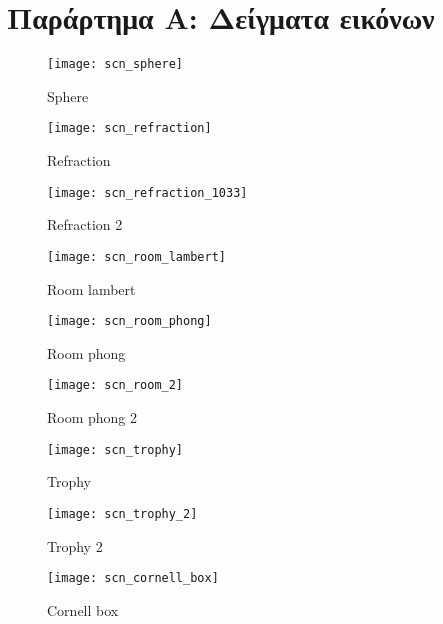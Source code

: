 \chapter{Παράρτημα A: Δείγματα εικόνων}
\clearpage

\graphicspath{{appendix1/fig/}}

\begin{figure} 
\centering 
\texttt{[image: scn\_sphere]}
\caption{Sphere}
\end{figure}

\begin{figure} 
\centering 
\texttt{[image: scn\_refraction]}
\caption{Refraction}
\end{figure}

\begin{figure} 
\centering 
\texttt{[image: scn\_refraction\_1033]}
\caption{Refraction 2}
\end{figure}

\begin{figure} 
\centering 
\texttt{[image: scn\_room\_lambert]}
\caption{Room lambert}
\end{figure}

\begin{figure} 
\centering 
\texttt{[image: scn\_room\_phong]}
\caption{Room phong}
\end{figure}

\begin{figure} 
\centering 
\texttt{[image: scn\_room\_2]}
\caption{Room phong 2}
\end{figure}

\begin{figure} 
\centering 
\texttt{[image: scn\_trophy]}
\caption{Trophy}
\end{figure}

\begin{figure} 
\centering 
\texttt{[image: scn\_trophy\_2]}
\caption{Trophy 2}
\end{figure}

\begin{figure} 
\centering 
\texttt{[image: scn\_cornell\_box]}
\caption{Cornell box}
\end{figure}

